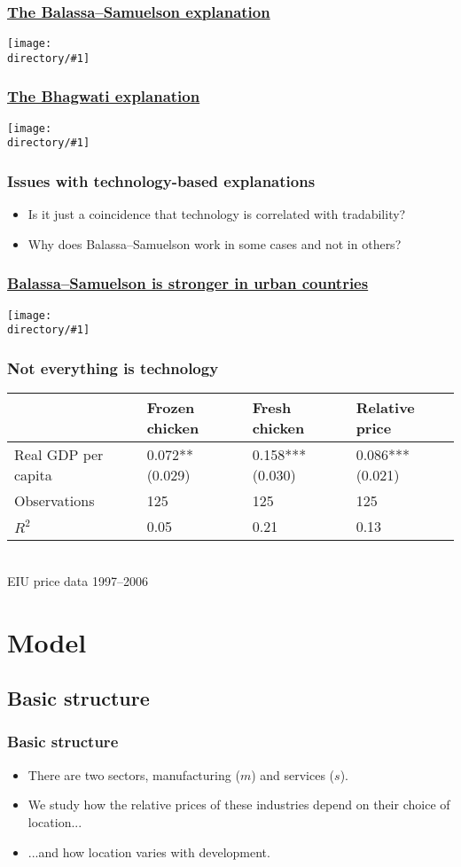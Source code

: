 \documentclass[compress,mathserif]{beamer}
\newcounter{perc}
\newcounter{percek}
\newcommand{\directory}{figures}
\newcommand{\widefigure}[2]{\begin{frame}\frametitle{\hyperlink{#1back}{#2}}\hypertarget{#1}{{\begin{center}\texttt{[image: \\directory/\#1]}\end{center}}}\end{frame}}
\renewcommand{\time}[1]{\addtocounter{percek}{#1}}
\begin{document}
\widefigure{PPF-balassa}{The Balassa--Samuelson explanation}
\widefigure{PPF-bhagwati}{The Bhagwati explanation}



\begin{frame}\frametitle{Issues with technology-based explanations}

\begin{itemize}
    \item Is it just a coincidence that technology is correlated with tradability?
    \item Why does Balassa--Samuelson work in some cases and not in others?
\end{itemize}
\end{frame}


\widefigure{sc_penn}{Balassa--Samuelson is stronger in urban countries}

\time{2}

\begin{frame}\frametitle{Not everything is technology}
\begin{center}
\begin{tabular}{lm{5em}m{5em}m{5em}}
  \hline
   & Frozen chicken & Fresh chicken & Relative price\\
   \hline
  Real GDP per capita & 0.072**   (0.029) & 0.158***   (0.030) & 0.086***   (0.021)\\
\hline
  Observations &  125 & 125 & 125
\\
  $R^2$ &  0.05& 0.21 & 0.13
\\
  \hline
\end{tabular}\\
{\small EIU price data 1997--2006}
\end{center}
\end{frame}

\time 2




\section{Model}
\subsection{Basic structure}
\begin{frame}\frametitle{Basic structure}
\begin{itemize}
    \item There are two sectors, manufacturing ($m$) and services ($s$).
    \item We study how the relative prices of these industries depend on their choice of location...
    \item ...and how location varies with development.
\end{itemize}
\end{frame}
\end{document}
